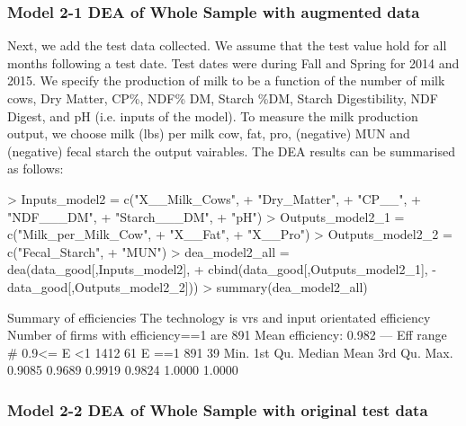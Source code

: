 \documentclass[12pt,]{article}
\begin{document}
\subsubsection{Model 2-1 DEA of Whole Sample with augmented data}
Next, we add the test data collected. We assume that the test value hold for all months following a test date. Test dates were during Fall and Spring for 2014 and 2015. We specify the production of milk to be a function of the number of milk cows, Dry Matter, CP\%, NDF\% DM, Starch \%DM, Starch Digestibility, NDF Digest, and pH (i.e. inputs of the model). To measure the milk production output, we choose milk (lbs) per milk cow, fat, pro, (negative) MUN and (negative) fecal starch the output vairables. The DEA results can be summarised as follows:


\begin{Schunk}
\begin{Sinput}
> Inputs_model2 = c("X__Milk_Cows", 
+                   "Dry_Matter", 
+                   "CP__", 
+                   "NDF___DM", 
+                   "Starch___DM", 
+                   "pH")
> Outputs_model2_1 = c("Milk_per_Milk_Cow",
+                    "X__Fat",
+                    "X__Pro")
> Outputs_model2_2 = c("Fecal_Starch",
+                      "MUN")
> dea_model2_all = dea(data_good[,Inputs_model2],
+                  cbind(data_good[,Outputs_model2_1], -data_good[,Outputs_model2_2]))
> summary(dea_model2_all)
\end{Sinput}
\begin{Soutput}
Summary of efficiencies
The technology is vrs and input orientated efficiency
Number of firms with efficiency==1 are 891 
Mean efficiency: 0.982 
---                
  Eff range         #  %
  0.9<= E <1     1412 61
        E ==1     891 39
   Min. 1st Qu.  Median    Mean 3rd Qu.    Max. 
 0.9085  0.9689  0.9919  0.9824  1.0000  1.0000 
\end{Soutput}
\end{Schunk}

\subsubsection{Model 2-2 DEA of Whole Sample with original test data}
\end{document}
